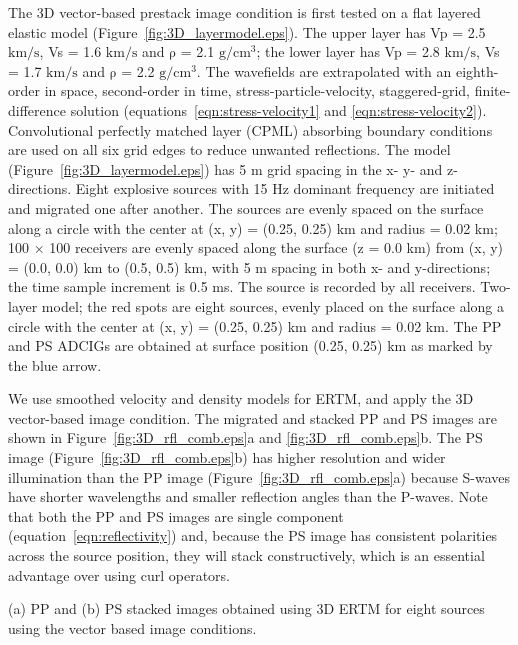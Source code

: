 \documentclass[manuscript,ulem,graphix,revised]{geophysics}
\begin{document}
The 3D vector-based prestack image condition is first tested on a flat layered elastic model (Figure~\ref{fig:3D_layermodel.eps}). The upper layer has Vp = 2.5 $\mathrm{km/s}$,  Vs = 1.6 $\mathrm{km/s}$ and  $\mathrm{\rho}$ = 2.1 $\mathrm{g/cm^3}$; the lower layer has  Vp = 2.8 $\mathrm{km/s}$,  Vs = 1.7 $\mathrm{km/s}$ and  $\mathrm{\rho}$ = 2.2 $\mathrm{g/cm^3}$.
The wavefields are extrapolated with an eighth-order in space, second-order in time, stress-particle-velocity, staggered-grid, finite-difference solution (equations~\ref{eqn:stress-velocity1} and \ref{eqn:stress-velocity2}). Convolutional perfectly matched layer (CPML) absorbing boundary conditions \citep{komatitsch07} are used on all six grid edges to reduce unwanted reflections.
The model (Figure~\ref{fig:3D_layermodel.eps}) has 5 m grid spacing in the x- y- and z-directions. 
Eight explosive sources with 15 Hz dominant frequency are initiated and migrated one after another. The sources are evenly spaced on the surface along a circle with the center at (x, y) = (0.25, 0.25) km and radius = 0.02 km; 100 $\times$ 100 receivers are evenly spaced along the surface (z = 0.0 km) from  (x, y) = (0.0, 0.0) km to (0.5, 0.5) km, with 5 m spacing in both x- and y-directions; the time sample increment is 0.5 ms. The source is recorded by all receivers.
{
Two-layer model; the red spots are eight sources, evenly placed on the surface along a circle with the center at (x, y) = (0.25, 0.25) km and radius = 0.02 km. The PP and PS ADCIGs are obtained at surface position (0.25, 0.25) km as marked by the blue arrow.
}

We use smoothed velocity and density models for ERTM, and apply the 3D vector-based image condition. The migrated and stacked PP and PS images are shown in Figure~\ref{fig:3D_rfl_comb.eps}a and \ref{fig:3D_rfl_comb.eps}b. The PS image (Figure~\ref{fig:3D_rfl_comb.eps}b) has higher resolution and wider illumination than the PP image (Figure~\ref{fig:3D_rfl_comb.eps}a) because S-waves have shorter wavelengths and smaller reflection angles than the P-waves. Note that both the PP and PS images are single component (equation~\ref{eqn:reflectivity}) and, because the PS image has consistent polarities across the source position, they will stack constructively, which is an essential advantage over using curl operators. 

{
(a) PP and (b) PS stacked images obtained using 3D ERTM for eight sources using the vector based image conditions.
}
\end{document}

